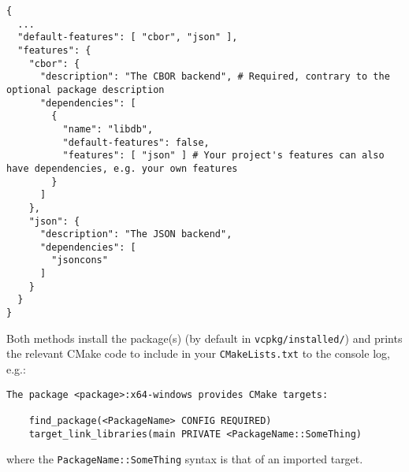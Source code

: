 \documentclass[8pt, table, xcdraw]{article}%
\begin{document}
\begin{itemize}
    \begin{lstlisting}
{
  ...
  "default-features": [ "cbor", "json" ],
  "features": {
    "cbor": {
      "description": "The CBOR backend", # Required, contrary to the optional package description
      "dependencies": [
        {
          "name": "libdb",
          "default-features": false,
          "features": [ "json" ] # Your project's features can also have dependencies, e.g. your own features
        }
      ]
    },
    "json": {
      "description": "The JSON backend",
      "dependencies": [
        "jsoncons"
      ]
    }
  }
}
    \end{lstlisting}
    
\end{itemize}

Both methods install the package(s) (by default in \lstinline{vcpkg/installed/}) and prints the relevant CMake code to include in your \lstinline{CMakeLists.txt} to the console log, e.g.:

\begin{lstlisting}
The package <package>:x64-windows provides CMake targets:

    find_package(<PackageName> CONFIG REQUIRED)
    target_link_libraries(main PRIVATE <PackageName::SomeThing)
\end{lstlisting}

where the \lstinline{PackageName::SomeThing} syntax is that of an imported target.
\end{document}
